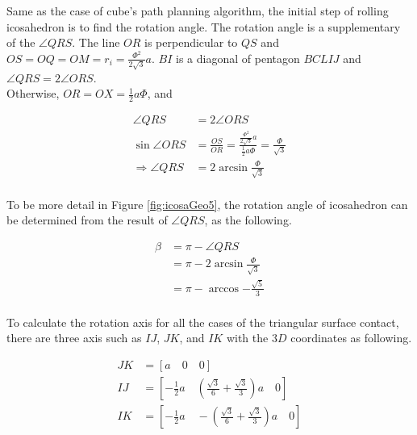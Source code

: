 \noindent Same as the case of cube's path planning algorithm, the initial step of rolling icosahedron is to find the rotation angle. 
The rotation angle is a supplementary of the $\angle{QRS}$. 
The line $OR$ is perpendicular to $QS$ and $OS = OQ = OM = r_i = \frac{\Phi^2}{2\sqrt{3}}a$. 
$BI$ is a diagonal of pentagon $BCLIJ$ and $\angle{QRS}=2\angle{ORS}$.\\

\noindent Otherwise, $OR=OX=\frac{1}{2}a\Phi$, and

\begin{equation*} 
\label{icosa:eq2}
\begin{split}
\angle{QRS} & = 2\angle{ORS}\\
\sin{\angle{ORS}} & = \frac{OS}{OR} = \frac{ \frac{\Phi^2}{2\sqrt{3}}a}{\frac{1}{2}a\Phi} = \frac{\Phi}{\sqrt{3}}\\
\Rightarrow \angle{QRS} & =2\arcsin{\frac{\Phi}{\sqrt{3}}}\\
\end{split}
\end{equation*}

\noindent To be more detail in Figure \ref{fig:icosaGeo5}, the rotation angle of icosahedron can be determined from the result of $\angle{QRS}$, as the following. 

\begin{equation*} 
\label{icosa:eq3}
\begin{split}
\beta & = \pi- \angle{QRS}\\
      & = \pi - 2\arcsin{\frac{\Phi}{\sqrt{3}}}\\
      & = \pi- \arccos{-\frac{\sqrt{5}}{3}}\\
\end{split}
\end{equation*}

\noindent To calculate the rotation axis for all the cases of the triangular surface contact, there are three axis such as $IJ$, $JK$, and $IK$ with the $3D$ coordinates as following.

\begin{align*}
\label{icosa:eq4}
JK & = [a\quad  0\quad  0]\\
IJ & = [-\frac{1}{2}a\quad  (\frac{\sqrt{3}}{6}+\frac{\sqrt{3}}{3})a\quad  0]\\
IK & = [-\frac{1}{2}a\quad  -(\frac{\sqrt{3}}{6}+\frac{\sqrt{3}}{3})a\quad  0]
\end{align*}

